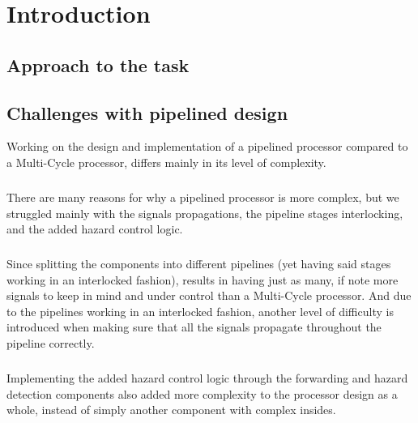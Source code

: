 \chapter{Introduction}


\section{Approach to the task}\label{intro:approach}


\section{Challenges with pipelined design}

Working on the design and implementation of a pipelined processor compared to a
Multi-Cycle processor, differs mainly in its level of complexity.
\paragraph*{}
There are many reasons for why a pipelined processor is more complex, but we
struggled mainly with the signals propagations, the pipeline stages
interlocking, and the added hazard control logic.
\paragraph*{}
Since splitting the components into different pipelines (yet having said stages
working in an interlocked fashion), results in having just as many, if note more
signals to keep in mind and under control than a Multi-Cycle processor. And due
to the pipelines working in an interlocked fashion, another level of difficulty
is introduced when making sure that all the signals propagate throughout the
pipeline correctly.
\paragraph*{}
Implementing the added hazard control logic through the forwarding and hazard
detection components also added more complexity to the processor design as a
whole, instead of simply another component with complex insides.
